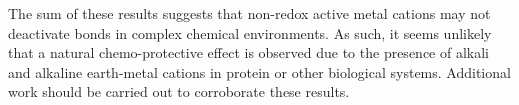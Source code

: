 \begin{doublespace}
The sum of these results suggests that non-redox active metal cations may not
deactivate  bonds in complex chemical environments. As such, it seems
unlikely that a natural chemo-protective effect is observed due to the presence
of alkali and alkaline earth-metal cations in protein or other biological
systems. Additional work should be carried out to corroborate these results.


\end{doublespace}
